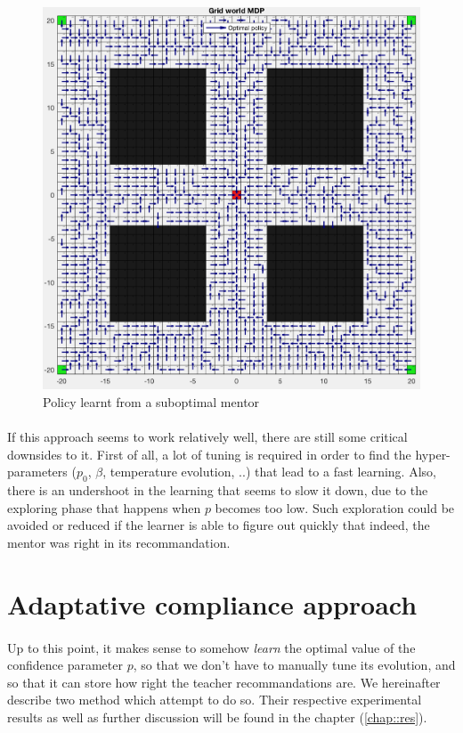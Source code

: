 \documentclass[a4paper]{report}
\begin{document}
{{{{			\begin{figure}[h!]
				\begin{center}
					\includegraphics[width=0.7\linewidth]{learnt_from_mentor}
					\caption{Policy learnt from a suboptimal mentor}
					\label{fig::learnt_from_mentor}
				\end{center}
			\end{figure}


		}		
		
		\paragraph{} If this approach seems to work relatively well, there are still some critical downsides to it. First of all, a lot of tuning is required in order to find the hyper-parameters ($p_0$, $\beta$, temperature evolution, ..) that lead to a fast learning. Also, there is an undershoot in the learning that seems to slow it down, due to the exploring phase that happens when $p$ becomes too low.  Such exploration could be avoided or reduced if the learner is able to figure out quickly that indeed, the mentor was right in its recommandation.
	}
	
	\section{Adaptative compliance approach}
	{	
	
		\paragraph{} Up to this point, it makes sense to somehow \emph{learn} the optimal value of the confidence parameter $p$, so that we don't have to manually tune its evolution, and so that it can store how right the teacher recommandations are. We hereinafter describe two method which attempt to do so. Their respective experimental results as well as further discussion will be found in the chapter (\ref{chap::res}).  
		
}}}
\end{document}
